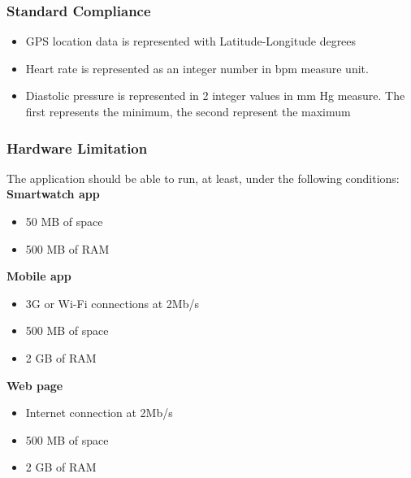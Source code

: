 \subsubsection{Standard Compliance}
\begin{itemize}
    \item GPS location data is represented with Latitude-Longitude degrees
    \item Heart rate is represented as an integer number in bpm measure unit. 
    \item Diastolic pressure is represented in 2 integer values in mm Hg measure. The first represents the minimum, the second represent the maximum
\end{itemize}

\subsubsection{Hardware Limitation}
The application should be able to run, at least, under the following conditions: 
\textbf{Smartwatch app}
\begin{itemize}
    \item 50 MB of space
    \item 500 MB of RAM
\end{itemize}
\textbf{Mobile app}
\begin{itemize}
    \item 3G or Wi-Fi connections at 2Mb/s 
    \item 500 MB of space
    \item 2 GB of RAM
\end{itemize}
\textbf{Web page}
\begin{itemize}
    \item Internet connection at 2Mb/s 
    \item 500 MB of space
    \item 2 GB of RAM 
\end{itemize}


